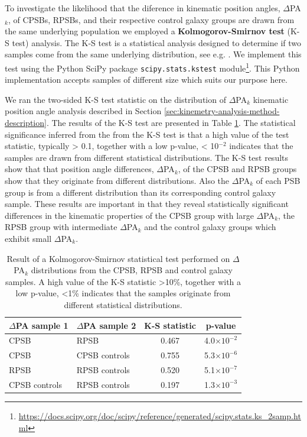 \label{sec:K-S-test}
To investigate the likelihood that the diference in kinematic position angles, $\Delta$PA$_{k}$, of CPSBs, RPSBs, and their respective control galaxy groups are drawn from the same underlying population we employed a \textbf{Kolmogorov-Smirnov test} (K-S test) analysis. The K-S test is a statistical analysis designed to determine if two samples come from the same underlying distribution, see e.g. \citet{hodges1958significance}. We implement this test using the Python SciPy package \texttt{scipy.stats.kstest} module\footnote{\href{https://docs.scipy.org/doc/scipy/reference/generated/scipy.stats.ks\_2samp.html}{https://docs.scipy.org/doc/scipy/reference/generated/scipy.stats.ks\_2samp.html}}. This Python implementation accepts samples of different size which suits our purpose here.

We ran the two-sided K-S test statistic on the distribution of $\Delta$PA$_{k}$ kinematic position angle analysis described in Section \ref{sec:kinemetry-analysis-method-description}. The results of the K-S test are presented in Table \ref{tab:K-S-tests}. The statistical significance inferred from the from the K-S test is that a high value of the test statistic, typically > 0.1, together with a low p-value, < 10$^{-2}$ indicates that the samples are drawn from different statistical distributions. The K-S test results show that  that position angle differences, $\Delta$PA$_{k}$, of the CPSB and RPSB groups show that they originate from different distributions. Also the $\Delta$PA$_{k}$ of each PSB group is from a different distribution than its corresponding control galaxy sample. These results are important in that they reveal statistically significant differences in the kinematic properties of the CPSB group with large $\Delta$PA$_{k}$, the RPSB group with intermediate $\Delta$PA$_{k}$ and the control galaxy groups which exhibit small $\Delta$PA$_{k}$. 

\begin{table}
\caption[Kolmogorov-Smirnov statistical test of $\Delta$PA distributions]{Result of a Kolmogorov-Smirnov statistical test performed on $\Delta$PA$_{k}$ distributions from the CPSB, RPSB and control galaxy samples. A high value of the K-S statistic \textgreater 10\%, together with a low p-value, \textless 1\% indicates that the samples originate from different statistical distributions.}
\label{tab:K-S-tests}
\begin{tabular}{llcc}
\hline
$\Delta$PA sample 1  & $\Delta$PA sample 2 & K-S statistic & p-value \\
\hline
CPSB & RPSB & 0.467 & 4.0$\times10^{-2}$ \\
CPSB & CPSB controls & 0.755 & 5.3$\times10^{-6}$ \\
RPSB & RPSB controls & 0.520 & 5.1$\times10^{-7}$ \\
CPSB controls & RPSB controls & 0.197 & 1.3$\times10^{-3}$ \\
\hline
\end{tabular}
\end{table}

